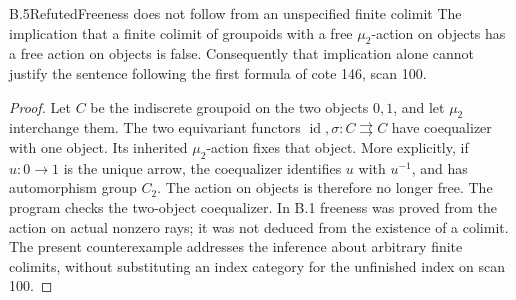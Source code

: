 \begin{result}{B.5}{Refuted}{Freeness does not follow from an unspecified finite colimit}
The implication that a finite colimit of groupoids with a free
$\mu_2$-action on objects has a free action on objects is false.
Consequently that implication alone cannot justify the sentence
following the first formula of cote 146, scan 100.
\end{result}
\begin{proof}
Let $C$ be the indiscrete groupoid on the two objects $0,1$, and let
$\mu_2$ interchange them.  The two equivariant functors
$\operatorname{id},\sigma:C\rightrightarrows C$ have coequalizer
with one object.  Its inherited $\mu_2$-action fixes that object.
More explicitly, if $u:0\to1$ is the unique arrow, the coequalizer
identifies $u$ with $u^{-1}$, and has automorphism group $C_2$.
The action on objects is therefore no longer free.  The program
checks the two-object coequalizer.  In B.1 freeness was proved from
the action on actual nonzero rays; it was not deduced from the
existence of a colimit.  The present counterexample addresses the
inference about arbitrary finite colimits, without substituting
an index category for the unfinished index on scan 100.
\end{proof}

